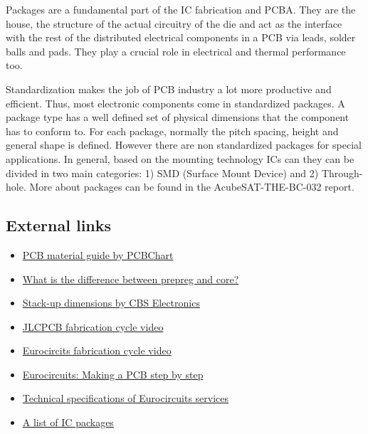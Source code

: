 \documentclass[final]{cubedoc}
\begin{document}
	Packages are a fundamental part of the IC fabrication and PCBA. They are the house, the structure of the actual circuitry of the die and act as the interface with the rest of the distributed electrical components in a PCB via leads, solder balls and pads. They play a crucial role in electrical and thermal performance too.
	
	Standardization makes the job of PCB industry a lot more productive and efficient. Thus, most electronic components come in standardized packages. A package type has a well defined set of physical dimensions that the component has to conform to. For each package, normally the pitch spacing, height and general shape is defined. However there are non standardized packages for special applications. In general, based on the mounting technology ICs can they can be divided in two main categories: 1) SMD (Surface Mount Device) and 2) Through-hole. More about packages can be found in the AcubeSAT-THE-BC-032 report.
	
	\subsection{External links} %
	
	\begin{itemize}
		\item \href{https://web.archive.org/web/20200814084633/https://www.pcbcart.com/pcb-capability/pcb-materials.html}{PCB material guide by PCBChart}
		\item \href{https://web.archive.org/web/20200814084719/https://electronics.stackexchange.com/questions/356063/what-exactly-is-prepreg-and-core-in-a-pcb}{What is the difference between prepreg and core?}
		\item \href{https://web.archive.org/web/20200814084757/https://www.cbspcb.com/pcboard-stackups/}{Stack-up dimensions by CBS Electronics} 
		\item \href{https://www.youtube.com/watch?v=ljOoGyCso8s&t=311s}{JLCPCB fabrication cycle video}
		\item \href{https://www.youtube.com/watch?v=sIV0icM_Ujo&t=436s}{Eurocircits fabrication cycle video}
		\item \href{https://web.archive.org/web/20200814085226/https://www.eurocircuits.com/making-a-pcb-pcb-manufacture-step-by-step/}{Eurocircuits: Making a PCB step by step}
		\item \href{https://web.archive.org/web/20200814085350/https://www.eurocircuits.com/technical-specifications-of-all-eurocircuits-prototype-small-volume-services-european-origin/}{Technical specifications of Eurocircuits services}    
		\item \href{https://web.archive.org/web/20200814085429/https://en.wikipedia.org/wiki/List_of_integrated_circuit_packaging_types}{A list of IC packages}
	\end{itemize}
	
\end{document}
